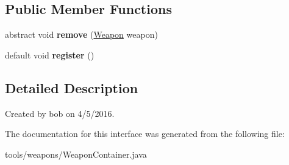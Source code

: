 \subsection*{Public Member Functions}
\begin{DoxyCompactItemize}
\item 
abstract void {\bfseries remove} (\hyperlink{classtools_1_1weapons_1_1_weapon}{Weapon} weapon)\hypertarget{interfacetools_1_1weapons_1_1_weapon_container_af129aab055f13fd383fd5d20c5e1e88e}{}\label{interfacetools_1_1weapons_1_1_weapon_container_af129aab055f13fd383fd5d20c5e1e88e}

\item 
default void {\bfseries register} ()\hypertarget{interfacetools_1_1weapons_1_1_weapon_container_a24a8b8689a7f31659543b82304bb7a7e}{}\label{interfacetools_1_1weapons_1_1_weapon_container_a24a8b8689a7f31659543b82304bb7a7e}

\end{DoxyCompactItemize}


\subsection{Detailed Description}
Created by bob on 4/5/2016. 

The documentation for this interface was generated from the following file\+:\begin{DoxyCompactItemize}
\item 
tools/weapons/Weapon\+Container.\+java\end{DoxyCompactItemize}
